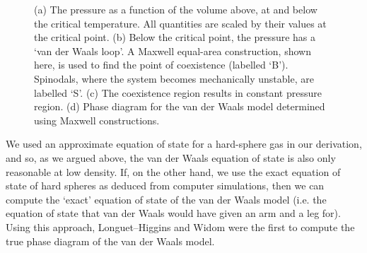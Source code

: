 \documentclass{article}
\theoremstyle{plain}\theoremheaderfont{\normalfont\bfseries}\theorembodyfont{\rmfamily}\theoremseparator{.}\newtheorem*{thm}{Theorem}\newtheorem*{law}{Law}\newtheorem*{pos}{Postulate}
\numberwithin{equation}{section}
\begin{document}
\begin{figure}
        \caption{(a) The pressure as a function of the volume above, at and below the critical temperature. All quantities are scaled by their values at the critical point. (b) Below the critical point, the pressure has a `van der Waals loop'. A Maxwell equal-area construction, shown here, is used to find the point of coexistence (labelled `B'). Spinodals, where the system becomes mechanically unstable, are labelled `S'. (c) The coexistence region results in constant pressure region. (d) Phase diagram for the van der Waals model determined using Maxwell constructions.}
        \label{vdW_loops}
    \end{figure}

    We used an approximate equation of state for a hard-sphere gas in our derivation, and so, as we argued above, the van der Waals equation of state is also only reasonable at low density. If, on the other hand, we use the exact equation of state of hard spheres as deduced from computer simulations, then we can compute the `exact' equation of state of the van der Waals model (i.e. the equation of state that van der Waals would have given an arm and a leg for). Using this approach, Longuet--Higgins and Widom were the first to compute the true phase diagram of the van der Waals model.
    
\end{document}
